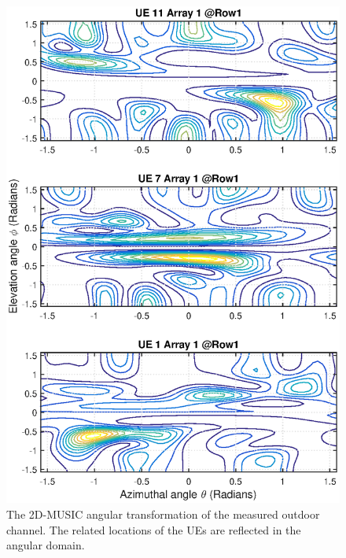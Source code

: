 \begin{figure}[t!]
	\centering
	\includegraphics[width=1\linewidth]{figures/2DMUSICcollocated_row1_array1.eps}
	\caption{The 2D-MUSIC angular transformation of the measured outdoor channel. The related locations of the UEs are reflected in the angular domain.}
	\label{fig:2DMUSIC-measured-collocated-channel}
\end{figure}




